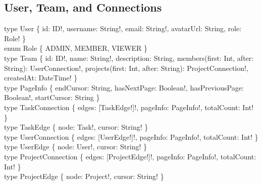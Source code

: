\subsection*{User, Team, and Connections}

\begin{schemabox}[title=Supporting Types]
type User \{ id: ID!,  username: String!,  email: String!,  avatarUrl: String,  role: Role! \}\\[1pt]
enum Role \{ ADMIN, MEMBER, VIEWER \}\\[1pt]
type Team \{ id: ID!, name: String!, description: String, members(first: Int, after: String): UserConnection!, projects(first: Int, after: String): ProjectConnection!, createdAt: DateTime! \}\\[1pt]
type PageInfo \{ endCursor: String, hasNextPage: Boolean!, hasPreviousPage: Boolean!, startCursor: String \}\\[1pt]
type TaskConnection     \{ edges: [TaskEdge!]!,     pageInfo: PageInfo!, totalCount: Int! \}\\[1pt]
type TaskEdge           \{ node: Task!,     cursor: String! \}\\[1pt]
type UserConnection     \{ edges: [UserEdge!]!,     pageInfo: PageInfo!, totalCount: Int! \}\\[1pt]
type UserEdge           \{ node: User!,     cursor: String! \}\\[1pt]
type ProjectConnection  \{ edges: [ProjectEdge!]!,  pageInfo: PageInfo!, totalCount: Int! \}\\[1pt]
type ProjectEdge        \{ node: Project!,  cursor: String! \}
\end{schemabox}
